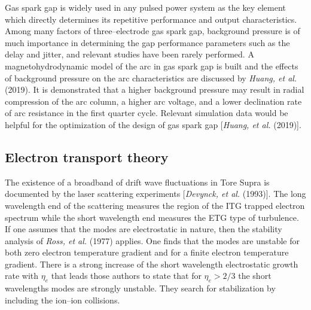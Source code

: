 \documentclass[a4paper,openany,12pt]{book}
\begin{document}
Gas spark gap is widely used in any pulsed power system as the key element which directly determines its repetitive performance and output characteristics. Among many factors of three--electrode gas spark gap, background pressure is of much importance in determining the gap performance parameters such as the delay and jitter, and relevant studies have been rarely performed. A magnetohydrodynamic model of the arc in gas spark gap is built and the effects of background pressure on the arc characteristics are discussed by \emph{Huang, et al.} (2019). It is demonstrated that a higher background pressure may result in radial compression of the arc column, a higher arc voltage, and a lower declination rate of arc resistance in the first quarter cycle. Relevant simulation data would be helpful for the optimization of the design of gas spark gap [\emph{Huang, et al.} (2019)].

\subsection{Electron transport theory}

The existence of a broadband of drift wave fluctuations in Tore Supra is documented by the laser scattering experiments [\emph{Devynck, et al.} (1993)]. The long wavelength end of the scattering measures the region of the ITG trapped electron spectrum while the short wavelength end measures the ETG type of turbulence. If one assumes that the modes are electrostatic in nature, then the stability analysis of \emph{Ross, et al.} (1977) applies. One finds that the modes are unstable for both zero electron temperature gradient and for a finite electron temperature gradient. There is a strong increase of the short wavelength electrostatic growth rate with $\eta_e$ that leads those authors to state that for $\eta_e>2/3$ the short wavelengths modes are strongly unstable. They search for stabilization by including the ion--ion collisions.
\end{document}
